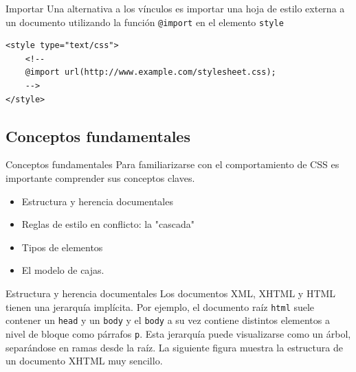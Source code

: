 \begin{frame}[fragile]{Importar} %
    Una alternativa a los vínculos es importar una hoja de estilo externa a un
    documento utilizando la función \texttt{@import} en el elemento
    \texttt{style}

    \begin{lstlisting}
<style type="text/css"> 
    <!-- 
    @import url(http://www.example.com/stylesheet.css);
    -->
</style> 
    \end{lstlisting}
\end{frame}


\subsection{Conceptos fundamentales} %

\begin{frame}{Conceptos fundamentales} %
    Para familiarizarse con el comportamiento de CSS es importante comprender
    sus conceptos claves.

    \begin{itemize}
        \item Estructura y herencia documentales 
        \item Reglas de estilo en conflicto: la "cascada"
        \item Tipos de elementos
        \item El modelo de cajas. 
    \end{itemize}
\end{frame}

\begin{frame}{Estructura y herencia documentales}
    Los documentos XML, XHTML y HTML tienen una jerarquía implícita. Por
    ejemplo, el documento raíz \texttt{html} suele contener un \texttt{head} y
    un \texttt{body} y el \texttt{body} a su vez contiene distintos elementos a
    nivel de bloque como párrafos \texttt{p}. Esta jerarquía puede visualizarse
    como un árbol, separándose en ramas desde la raíz. La siguiente figura
    muestra la estructura de un documento XHTML muy sencillo.

\end{frame}

